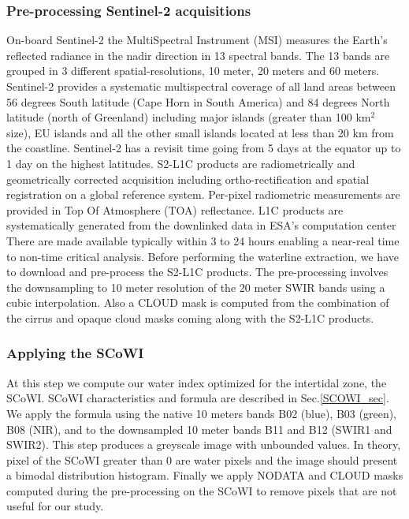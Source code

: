 \documentclass[remotesensing,article,submit,pdftex,moreauthors]{Definitions/mdpi}
\begin{document}
\subsubsection{Pre-processing Sentinel-2 acquisitions}
On-board Sentinel-2 the MultiSpectral Instrument (MSI) measures the Earth's reflected radiance in the nadir direction in 13 spectral bands. 
The 13 bands are grouped in 3 different spatial-resolutions, 10 meter, 20 meters and 60 meters.
Sentinel-2 provides a systematic multispectral coverage of all land areas between 56 degrees South latitude (Cape Horn in South America) and 84 degrees North latitude (north of Greenland) including major islands (greater than 100 km$^2$ size), EU islands and all the other small islands located at less than 20 km from the coastline. 
Sentinel-2 has a revisit time going from 5 days at the equator up to 1 day on the highest latitudes. 
\citep{ESAreq}
S2-L1C products are radiometrically and geometrically corrected acquisition including ortho-rectification and spatial registration on a global reference system.
Per-pixel radiometric measurements are provided in Top Of Atmosphere (TOA) reflectance.
L1C products are systematically generated from the downlinked data in ESA's computation center
There are made available typically within 3 to 24 hours enabling a near-real time to non-time critical analysis.
Before performing the waterline extraction, we have to download and pre-process the S2-L1C products.
The pre-processing involves the downsampling to 10 meter resolution of the 20 meter SWIR bands using a cubic interpolation.
Also a CLOUD mask is computed from the combination of the cirrus and opaque cloud masks coming along with the S2-L1C products.
    
\subsubsection{Applying the SCoWI}
At this step we compute our water index optimized for the intertidal zone, the SCoWI.
SCoWI characteristics and formula are described in Sec.\ref{SCOWI_sec}.
We apply the formula using the native 10 meters bands B02 (blue), B03 (green), B08 (NIR), and to the downsampled 10 meter bands B11 and B12 (SWIR1 and SWIR2).
This step produces a greyscale image with unbounded values.
In theory, pixel of the SCoWI greater than 0 are water pixels and the image should present a bimodal distribution histogram.
Finally we apply NODATA and CLOUD masks computed during the pre-processing on the SCoWI to remove pixels that are not useful for our study.
\end{document}
